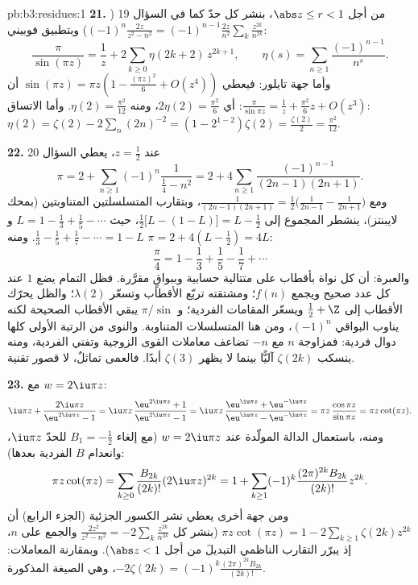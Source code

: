 \begin{solution}{pb:b3:residues:1}
\textbf{21.} من أجل $\abs z \leq r < 1$، بنشر كل حدّ كما في السؤال 19
($(-1)^n\frac{2z}{z^2-n^2} =
(-1)^{n-1}\frac{2z}{n^2}\sum_k\frac{z^{2k}}{n^{2k}}$) وبتطبيق فوبيني:
\[
\frac{\pi}{\sin(\pi z)} = \frac1z +
2\sum_{k\geq0}\eta(2k+2)\,z^{2k+1},
\qquad
\eta(s) = \sum_{n\geq1}\frac{(-1)^{n-1}}{n^s} .
\]
وأما جهة تايلور: فيعطي $\sin(\pi z) = \pi z(1 - \frac{(\pi z)^2}6 +
O(z^4))$ أن $\frac\pi{\sin\pi z} = \frac1z +
\frac{\pi^2}6z + O(z^3)$: أي $2\eta(2) = \frac{\pi^2}6$، ومنه
$\eta(2) = \frac{\pi^2}{12}$. وأما الاتساق: $\eta(2) =
\zeta(2) - 2\sum_n(2n)^{-2} = (1 - 2^{1-2})\zeta(2) =
\frac{\zeta(2)}2 = \frac{\pi^2}{12}$.

\textbf{22.} عند $z = \frac12$، يعطي السؤال 20
\[
\pi = 2 + \sum_{n\geq1}(-1)^n\frac{1}{\frac14 - n^2}
= 2 + 4\sum_{n\geq1}\frac{(-1)^{n-1}}{(2n-1)(2n+1)} .
\]
ومع $\frac1{(2n-1)(2n+1)} = \frac12\bigl(\frac1{2n-1} -
\frac1{2n+1}\bigr)$، وبتقارب المتسلسلتين المتناوبتين (بمحك لايبنتز)،
ينشطر المجموع إلى $\frac12\bigl[L -
(1 - L)\bigr] = L - \frac12$، حيث $L = 1 - \frac13 +
\frac15 - \cdots$ و $\frac13 - \frac15 + \frac17 - \cdots
= 1 - L$. ومنه $\pi = 2 + 4(L - \frac12) = 4L$:
\[
\frac\pi4 = 1 - \frac13 + \frac15 - \frac17 + \cdots
\]
والعبرة: أن كل نواة  بأقطاب على متتالية حسابية وببواقٍ
مقرَّرة. فظل التمام يضع  $1$ عند كل عدد صحيح ويجمع
$f(n)$؛ ومشتقته تربّع الأقطاب وتسعّر $\lambda(2)$؛ والظل يحرّك
الأقطاب إلى $\frac12 + \Z$ ويسعّر المقامات الفردية؛
و $\pi/\sin$ يبقي الأقطاب الصحيحة لكنه يناوب البواقي
$(-1)^n$، ومن هنا المتسلسلات المتناوبة. والنوى من الرتبة
الأولى كلها دوال فردية: فمزاوجة $n$ مع $-n$ تضاعف معاملات
القوى الزوجية وتفني الفردية، ومنه ينسكب $\zeta(2k)$ آليًّا
بينما لا يظهر $\zeta(3)$ أبدًا. فالعمى تماثلٌ، لا قصور تقنية.

\textbf{23.} مع $w = 2\iu\pi z$:
\[
\iu\pi z + \frac{2\iu\pi z}{\eu^{2\iu\pi z} - 1}
= \iu\pi z\,\frac{\eu^{2\iu\pi z} + 1}{\eu^{2\iu\pi z} - 1}
= \iu\pi z\,\frac{\eu^{\iu\pi z} +
\eu^{-\iu\pi z}}{\eu^{\iu\pi z} - \eu^{-\iu\pi z}}
= \pi z\,\frac{\cos\pi z}{\sin\pi z} = \pi z\cot(\pi z) .
\]
ومنه، باستعمال الدالة المولّدة عند $w = 2\iu\pi z$ (مع إلغاء
$B_1 = -\frac12$ للحدّ $\iu\pi z$، وانعدام $B$ الفردية بعدها):
\[
\pi z\cot(\pi z) = \sum_{k\geq0}\frac{B_{2k}}{(2k)!}
(2\iu\pi z)^{2k}
= 1 + \sum_{k\geq1}(-1)^k\frac{(2\pi)^{2k}B_{2k}}{(2k)!}
z^{2k} .
\]
ومن جهة أخرى يعطي نشر الكسور الجزئية (الجزء الرابع) أن $\pi z\cot(\pi z) = 1 - 2\sum_{k\geq1}\zeta(2k)z^{2k}$
(بنشر كل $\frac{2z^2}{z^2 - n^2} =
-2\sum_k\frac{z^{2k}}{n^{2k}}$ والجمع على $n$، إذ يبرّر التقارب الناظمي
التبديلَ من أجل $\abs z < 1$). وبمقارنة المعاملات: $-2\zeta(2k) =
(-1)^k\frac{(2\pi)^{2k}B_{2k}}{(2k)!}$، وهي
الصيغة المذكورة.


\end{solution}
